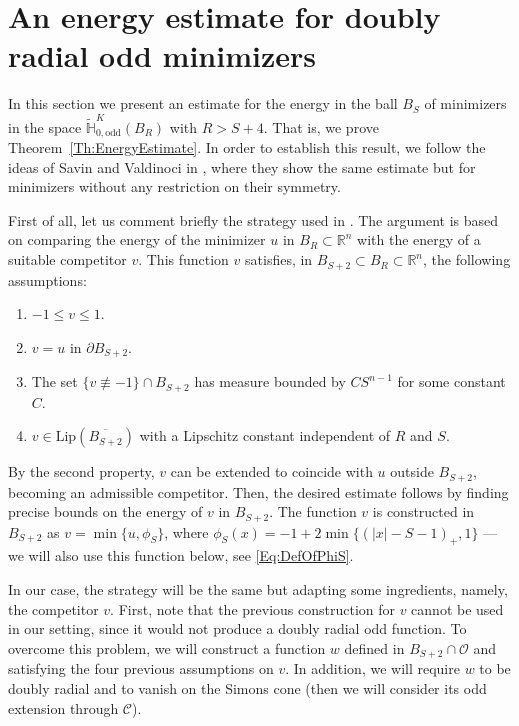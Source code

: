 \documentclass[12pt,reqno]{amsart}
\theoremstyle{definition}
\theoremstyle{remark}
\newcommand{\con}[1]{\mathbb{#1}}
\newcommand{\R}{\con{R}} %
\renewcommand{\H}{\con{H}}
\newcommand{\ccal}{\mathscr{C}}
\newcommand{\ocal}{\mathcal{O}}
\newcommand{\Lip}{\mathrm{Lip}}
\numberwithin{equation}{section}
\begin{document}
\section{An energy estimate for doubly radial odd minimizers}
\label{Sec:EnergyEstimate}

In this section we present an estimate for the energy in the ball $B_S$ of minimizers in the space $\widetilde{\H}^K_{0, \mathrm{odd}}(B_R)$ with $R > S+ 4$. That is, we prove Theorem~\ref{Th:EnergyEstimate}. In order to establish this result, we follow the ideas of Savin and Valdinoci in \cite{SavinValdinoci-EnergyEstimate}, where they show the same estimate but for minimizers without any restriction on their symmetry.


First of all, let us comment briefly the strategy used in \cite{SavinValdinoci-EnergyEstimate}. The argument is based on comparing the energy of the minimizer $u$ in $B_R\subset \R^n$ with the energy of a suitable competitor $v$. This function $v$ satisfies, in $B_{S+2}\subset B_R \subset \R^n$, the following assumptions:
\begin{enumerate}[label=(\textit{\roman*})]
	\item $-1 \leq v \leq 1$.
	\item $v=u$ in $\partial B_{S+2}$.
	\item The set $\{v\not \equiv -1\}\cap B_{S+2}$ has measure bounded by $C S^{n-1}$ for some constant $C$.
	\item $v\in \Lip(\overline{B_{S+2}})$ with a Lipschitz constant independent of $R$ and $S$.
\end{enumerate} 
By the second property, $v$ can be extended to coincide with $u$ outside $B_{S+2}$, becoming an admissible competitor. Then, the desired estimate follows by finding precise bounds on the energy of $v$ in $B_{S+2}$. The function $v$ is constructed in $B_{S+2}$ as $v = \min \{u, \phi_S\}$, where $\phi_S (x) =-1+2\min\{(|x|-S-1)_+,1\}$ ---we will also use this function below, see \eqref{Eq:DefOfPhiS}.

In our case, the strategy will be the same but adapting some ingredients, namely, the competitor $v$. First, note that the previous construction for $v$ cannot be used in our setting, since it would not produce a doubly radial odd function. To overcome this problem, we will construct a function $w$ defined in $B_{S+2}\cap \ocal$ and satisfying the four previous assumptions on $v$. In addition, we will require $w$ to be doubly radial and to vanish on the Simons cone (then we will consider its odd extension through $\ccal$).
\end{document}
